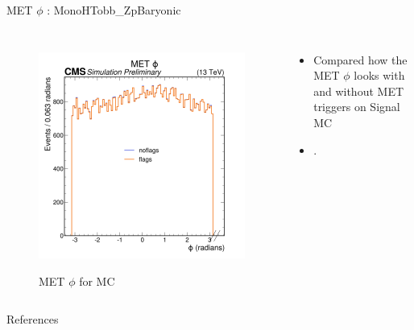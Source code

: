 \documentclass[10pt,xcolor=dvipsnames]{beamer}
\begin{document}
    \begin{frame}[fragile]{MET $\phi$ : MonoHTobb\_ZpBaryonic} 
      \begin{columns}
      \begin{figure} 
      \centering 
       \includegraphics[width=1\textwidth]{../Archive/KinemPlots/MCphiMETflags.png }
      \label{METData} 
      \caption{MET $\phi$ for MC}
      \end{figure} 
      \begin{itemize} 
      \raggedright 
      \small
      \item Compared how the MET $\phi$ looks with and without MET triggers on Signal MC
      \item .
      \end{itemize}
      \end{columns} 
      \end{frame}


\appendix



\begin{frame}[allowframebreaks]{References}

  
  

\end{frame}
\end{document}
